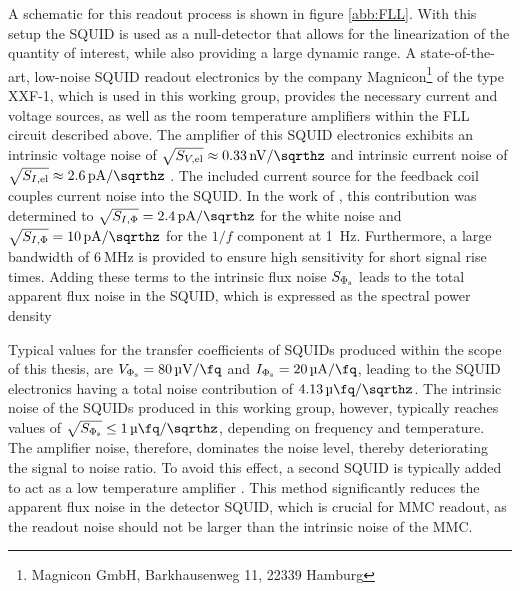 A schematic for this readout process is shown in figure \ref{abb:FLL}.  With this setup the SQUID is used as a null-detector that allows for the linearization of the quantity of interest, while also providing a large dynamic range. A state-of-the-art, low-noise SQUID readout electronics by the company Magnicon\footnote{Magnicon GmbH, Barkhausenweg 11, 22339 Hamburg} of the type XXF-1, which is used in this working group, provides the necessary current and voltage sources, as well as the room temperature amplifiers within the FLL circuit described above. The amplifier of this SQUID electronics exhibits an intrinsic voltage noise of $\sqrt{S_{V\rm ,el}}\approx\qty{0.33}{\nV\per\sqrthz}$ and intrinsic current noise of $\sqrt{S_{I\rm ,el}}\approx\qty{2.6}{\pA\per\sqrthz}$ \cite{Drung2006}. The included current source for the feedback coil couples current noise into the SQUID. In the work of \cite{Kaap2020}, this contribution was determined to $\sqrt{S_{I,\rm \Phi}}=\qty{2.4}{\pA\per\sqrthz}$ for the white noise and $\sqrt{S_{I,\rm \Phi}}=\qty{10}{\pA\per\sqrthz}$ for the $1/f$ component at \qty{1}{\Hz}. Furthermore, a large bandwidth of $\qty{6}{\MHz}$ is provided to ensure high sensitivity for short signal rise times. Adding these terms to the intrinsic flux noise $S_{\rm \Phi_s}$ leads to the total apparent flux noise in the SQUID, which is expressed as the spectral power density


Typical values for the transfer coefficients of SQUIDs produced within the scope of this thesis, are $V_{\rm \Phi_s}=\qty{80}{\uV\per\fq}$ and $I_{\rm \Phi_s}=\qty{20}{\uA\per\fq}$, leading to the SQUID electronics having a total noise contribution of $\qty{4.13}{\micro\fq\per\sqrthz}$. The intrinsic noise of the SQUIDs produced in this working group, however, typically reaches values of $\sqrt{S_{\Phi_{\rm s}}}\leq\qty{1}{\micro\fq\per\sqrthz}$, depending on frequency and temperature. The amplifier noise, therefore, dominates the noise level, thereby deteriorating the signal to noise ratio. To avoid this effect, a second SQUID is typically added to act as a low temperature amplifier \cite{Welty1993}. This method significantly reduces the apparent flux noise in the detector SQUID, which is crucial for MMC readout, as the readout noise should not be larger than the intrinsic noise of the MMC.


